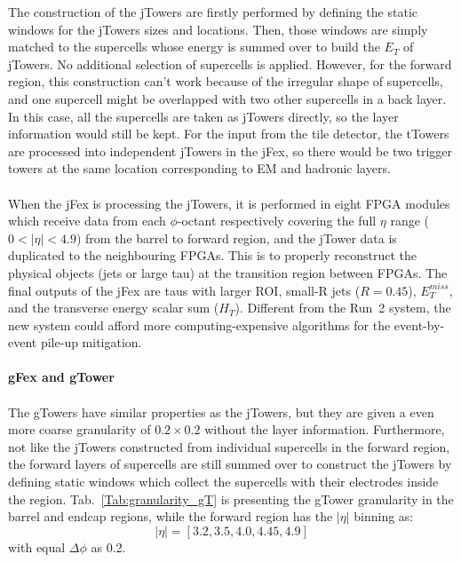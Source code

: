 The construction of the jTowers are firstly performed by defining the static windows for the jTowers sizes and locations. Then, those windows are simply matched to the supercells whose energy is summed over to build the $E_{T}$ of jTowers. No additional selection of supercells is applied. However, for the forward region, this construction can't work because of the irregular shape of supercells, and one supercell might be overlapped with two other supercells in a back layer. In this case, all the supercells are taken as jTowers directly, so the layer information would still be kept. For the input from the tile detector, the tTowers are processed into independent jTowers in the jFex, so there would be two trigger towers at the same location corresponding to EM and hadronic layers. 
\\
\\When the jFex is processing the jTowers, it is performed in eight FPGA modules which receive data from each $\phi$-octant respectively covering the full $\eta$ range ($0<|\eta|<4.9$) from the barrel to forward region, and the jTower data is duplicated to the neighbouring FPGAs\cite{Aad:1602235}. This is to properly reconstruct the physical objects (jets or large tau) at the transition region between FPGAs. The final outputs of the jFex are taus with larger ROI, small-R jets ($R=0.45$), $E^{miss}_{T}$, and the transverse energy scalar sum ($H_{T}$). Different from the Run~2 system, the new system could afford more computing-expensive algorithms for the event-by-event pile-up mitigation. 
\\
\\{\bf gFex and gTower}
\\
\\The gTowers have similar properties as the jTowers, but they are given a even more coarse granularity of $0.2\times0.2$ without the layer information. Furthermore, not like the jTowers constructed from individual supercells in the forward region, the forward layers of supercells are still summed over to construct the jTowers by defining static windows which collect the supercells with their electrodes inside the region. Tab.~\ref{Tab:granularity_gT} is presenting the gTower granularity in the barrel and endcap regions, while the forward region has the $|\eta|$ binning as:
\begin{equation}
|\eta| = \left[3.2, 3.5, 4.0, 4.45, 4.9\right]
\end{equation}
with equal $\Delta\phi$ as 0.2.
